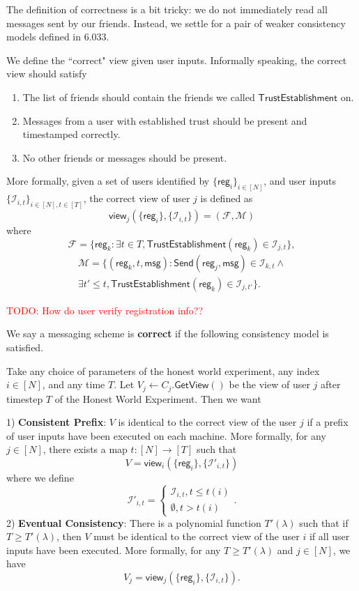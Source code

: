 \documentclass[sigconf, nonacm, balance=false, natbib=false, screen]{acmart}
\newcommand\todo[1]{\textcolor{red}{TODO: #1}}
\newcommand{\msg}{\mathsf{msg}}
\newcommand{\reg}{\mathsf{reg}}
\newcommand{\cI}{\mathcal{I}}
\newcommand{\cF}{\mathcal{F}}
\newcommand{\cM}{\mathcal{M}}
\begin{document}
The definition of correctness is a bit tricky: we do not immediately read all messages sent by our friends. Instead, we settle for a pair of weaker consistency models defined in 6.033. %
\begin{definition}
We define the ``correct" view given user inputs. Informally speaking, the correct view should satisfy
\begin{enumerate}
    \item The list of friends should contain the friends we called $\mathsf{TrustEstablishment}$ on.         
    \item Messages from a user with established trust should be present and timestamped correctly.  
    \item No other friends or messages should be present. 
\end{enumerate}
More formally, given a set of users identified by $\{\reg_i\}_{i \in [N]}$, and user inputs $\{\cI_{i, t}\}_{i \in [N], t \in [T]}$, the correct view of user $j$ is defined as
$$\mathsf{view}_j(\{\reg_i\}, \{\cI_{i, t}\}) = (\cF, \cM)$$
where
$$\cF = \{\reg_k: \exists t \in T, \mathsf{TrustEstablishment}(\reg_k) \in \cI_{j, t}\},$$
\begin{multline*}
 \cM = \{(\reg_k, t, \msg): \mathsf{Send}(\reg_j, \msg) \in \cI_{k, t} \land \\
 \exists t' \leq t, \mathsf{TrustEstablishment}(\reg_k) \in \cI_{j, t'}\}.   
\end{multline*}
\end{definition}
\todo{How do user verify registration info??}
\begin{definition}[Correctness]
 We say a messaging scheme is \textbf{correct} if the following consistency model is satisfied. 
 
 Take any choice of parameters of the honest world experiment, any index $i \in [N]$, and any time $T$. Let $V_j \leftarrow C_j.\mathsf{GetView}()$ be the view of user $j$ after timestep $T$ of the Honest World Experiment. Then we want

1) \textbf{Consistent Prefix}: $V$ is identical to the correct view of the user $j$ if a prefix of user inputs have been executed on each machine. More formally, for any $j \in [N]$, there exists a map $t: [N] \to [T]$ such that 
$$V = \mathsf{view}_i(\{\reg_i\}, \{\cI'_{i, t}\})$$
where we define
$$\cI'_{i, t} = \begin{cases}
\cI_{i, t}, t \leq t(i) \\
\emptyset, t > t(i)
\end{cases}.$$
2) \textbf{Eventual Consistency}: There is a polynomial function $T'(\lambda)$ such that if $T \geq T'(\lambda)$, then $V$ must be identical to the correct view of the user $i$ if all user inputs have been executed. More formally, for any $T \geq T'(\lambda)$ and $j \in [N]$, we have
$$V_j = \mathsf{view}_j(\{\reg_i\}, \{\cI_{i, t}\}).$$

\end{definition}
\end{document}
